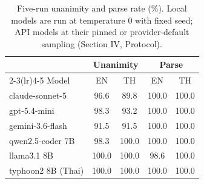 \begin{table}[t]
\caption{Five-run unanimity and parse rate (\%). Local models are run
at temperature 0 with fixed seed; API models at their pinned or
provider-default sampling (Section IV, Protocol).}
\label{tab:stability}
\centering\small
\begin{tabular}{lcccc}
\toprule
 & \multicolumn{2}{c}{Unanimity} & \multicolumn{2}{c}{Parse} \\
\cmidrule(lr){2-3}\cmidrule(lr){4-5}
Model & EN & TH & EN & TH \\
\midrule
claude-sonnet-5 & 96.6 & 89.8 & 100.0 & 100.0 \\
gpt-5.4-mini & 98.3 & 93.2 & 100.0 & 100.0 \\
gemini-3.6-flash & 91.5 & 91.5 & 100.0 & 100.0 \\
qwen2.5-coder 7B & 98.3 & 100.0 & 100.0 & 100.0 \\
llama3.1 8B & 100.0 & 100.0 & 98.6 & 100.0 \\
typhoon2 8B (Thai) & 100.0 & 100.0 & 100.0 & 100.0 \\
\bottomrule
\end{tabular}
\end{table}
